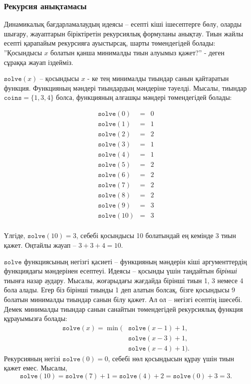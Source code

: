 \subsubsection{Рекурсия анықтамасы}

Динамикалық бағдарламалаудың идеясы -- 
есепті кіші ішесептерге бөлу, оларды шығару,
жауаптарын біріктіретін рекурсиялық формуланы анықтау.
Тиын жайлы есепті қарапайым рекурсияға ауыстырсақ, шарты төмендегідей болады:
''Қосындысы $x$ болатын қанша минималды тиын алуымыз қажет?'' - деген сұраққа жауап іздейміз. 

$\texttt{solve}(x)$ -- қосындысы $x$ - ке тең
минималды тиындар санын қайтаратын функция. 
Функцияның мәндері тиындардың мәндеріне тәуелді. 
Мысалы, тиындар $\texttt{coins} = \{1,3,4\}$ болса,
функцияның алғашқы мәндері төмендегідей болады:

\[
\begin{array}{lcl}
\texttt{solve}(0) & = & 0 \\
\texttt{solve}(1) & = & 1 \\
\texttt{solve}(2) & = & 2 \\
\texttt{solve}(3) & = & 1 \\
\texttt{solve}(4) & = & 1 \\
\texttt{solve}(5) & = & 2 \\
\texttt{solve}(6) & = & 2 \\
\texttt{solve}(7) & = & 2 \\
\texttt{solve}(8) & = & 2 \\
\texttt{solve}(9) & = & 3 \\
\texttt{solve}(10) & = & 3 \\
\end{array}
\]

Үлгіде, $\texttt{solve}(10)=3$,
себебі қосындысы 10 болатындай 
ең кемінде 3 тиын қажет.
Оңтайлы жауап -- $3+3+4=10$.

$\texttt{solve}$ функциясының негізгі қасиеті --
функцияның мәндерін
кіші аргументтердің функциядағы мәндерінен есептеуі.
Идеясы -- қосынды үшін таңдайтын \emph{бірінші} тиынға назар аудару.
Мысалы, жоғарыдағы жағдайда бірінші тиын 1, 3 немесе 4
бола алады. Егер біз бірінші тиынды 1 деп алатын болсақ,
бізге қосындысы 9 болатын минималды тиындар санын білу қажет.
Ал ол -- негізгі есептің ішесебі. Демек минималды тиындар
санын санайтын төмендегідей рекурсиялық функция құрауымызға болады:
\begin{equation*}
\begin{split}
\texttt{solve}(x) = \min( & \texttt{solve}(x-1)+1, \\
                           & \texttt{solve}(x-3)+1, \\
                           & \texttt{solve}(x-4)+1).
\end{split}
\end{equation*}
Рекурсияның негізі $\texttt{solve}(0)=0$,
себебі нөл қосындысын құрау үшін тиын қажет емес. 
Мысалы,
\[ \texttt{solve}(10) = \texttt{solve}(7)+1 = \texttt{solve}(4)+2 = \texttt{solve}(0)+3 = 3.\]

